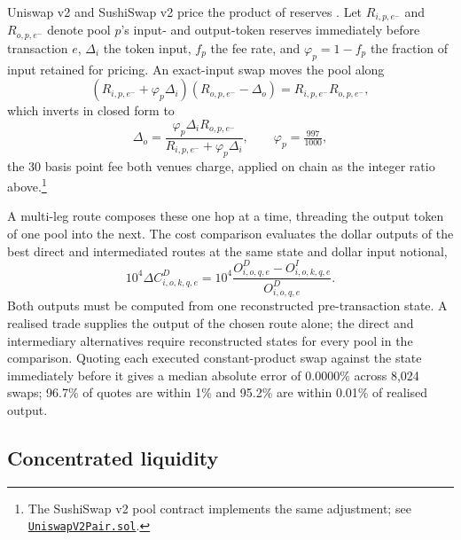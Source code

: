 Uniswap v2 and SushiSwap v2 price the product of reserves \citep{LeharParlour2024Uniswap}. Let $R_{i,p,e^-}$ and $R_{o,p,e^-}$ denote pool $p$'s input- and output-token reserves immediately before transaction $e$, $\Delta_i$ the token input, $f_p$ the fee rate, and $\varphi_p=1-f_p$ the fraction of input retained for pricing. An exact-input swap moves the pool along
\[
(R_{i,p,e^-}+\varphi_p\Delta_i)(R_{o,p,e^-}-\Delta_o)=R_{i,p,e^-}R_{o,p,e^-},
\]
which inverts in closed form to
\[
\Delta_o=\frac{\varphi_p\Delta_iR_{o,p,e^-}}{R_{i,p,e^-}+\varphi_p\Delta_i},
\qquad \varphi_p=\tfrac{997}{1000},
\]
the 30 basis point fee both venues charge, applied on chain as the integer ratio above.\footnote{The SushiSwap v2 pool contract implements the same adjustment; see \href{https://github.com/sushiswap/v2-core/blob/master/contracts/UniswapV2Pair.sol}{\texttt{UniswapV2Pair.sol}}.}

A multi-leg route composes these one hop at a time, threading the output token of one pool into the next. The cost comparison evaluates the dollar outputs of the best direct and intermediated routes at the same state and dollar input notional,
\[
10^4\Delta C^D_{i,o,k,q,e}
=10^4\frac{O^D_{i,o,q,e}-O^I_{i,o,k,q,e}}{O^D_{i,o,q,e}}.
\]
Both outputs must be computed from one reconstructed pre-transaction state. A realised trade supplies the output of the chosen route alone; the direct and intermediary alternatives require reconstructed states for every pool in the comparison. Quoting each executed constant-product swap against the state immediately before it gives a median absolute error of 0.0000\% across 8,024 swaps; 96.7\% of quotes are within 1\% and 95.2\% are within 0.01\% of realised output.

\subsection{Concentrated liquidity}
\label{app:quoters:cl}

